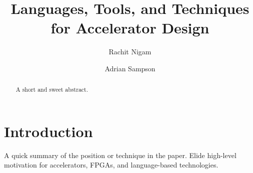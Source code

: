 \documentclass[sigplan,screen,sigconf]{acmart}
\author{Rachit Nigam}
\affiliation{
  \institution{Cornell University}
  \country{USA}
}
\author{Adrian Sampson}
\affiliation{
  \institution{Cornell University}
  \country{USA}
}
\begin{document}
\title{Languages, Tools, and Techniques for Accelerator Design}

\begin{abstract}
A short and sweet abstract.
\end{abstract}

\maketitle

\section{Introduction}

A quick summary of the position or technique in the paper. Elide
high-level motivation for accelerators, FPGAs, and language-based
technologies.
\end{document}
